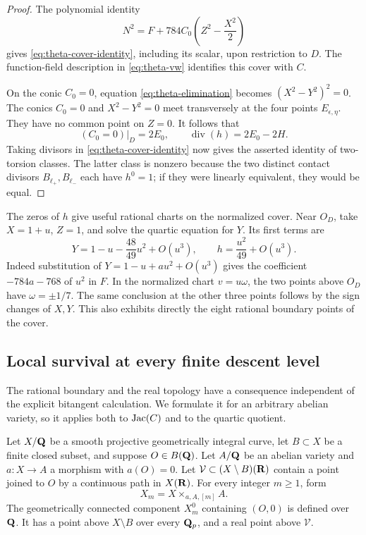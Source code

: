 \begin{proof}
The polynomial identity
\begin{equation}
 N^2=F+784C_0\left(Z^2-\frac{X^2}{2}\right)
 \label{eq:theta-conic-identity}
\end{equation}
gives \eqref{eq:theta-cover-identity}, including its scalar, upon
restriction to $D$.  The function-field description in
\eqref{eq:theta-vw} identifies this cover with $C$.

On the conic $C_0=0$, equation \eqref{eq:theta-elimination} becomes
$(X^2-Y^2)^2=0$.  The conics $C_0=0$ and $X^2-Y^2=0$ meet transversely at
the four points $E_{\epsilon,\eta}$.  They have no common point on $Z=0$.
It follows that
\[
 (C_0=0)|_D=2E_0,\qquad
 \operatorname{div}(h)=2E_0-2H.
\]
Taking divisors in \eqref{eq:theta-cover-identity} now gives the asserted
identity of two-torsion classes.  The latter class is nonzero because the
two distinct contact divisors $B_{\ell_+},B_{\ell_-}$ each have
$h^0=1$; if they were linearly equivalent, they would be equal.
\end{proof}

The zeros of $h$ give useful rational charts on the normalized cover.
Near $O_D$, take $X=1+u$, $Z=1$, and solve the quartic equation for $Y$.
Its first terms are
\begin{equation}
 Y=1-u-\frac{48}{49}u^2+O(u^3),\qquad
 h=\frac{u^2}{49}+O(u^3).
 \label{eq:theta-boundary-expansion}
\end{equation}
Indeed substitution of $Y=1-u+au^2+O(u^3)$ gives the coefficient
$-784a-768$ of $u^2$ in $F$.  In the normalized chart $v=u\omega$, the
two points above $O_D$ have $\omega=\pm1/7$.  The same conclusion at the
other three points follows by the sign changes of $X,Y$.  This also
exhibits directly the eight rational boundary points of the cover.

\subsection{Local survival at every finite descent level}

The rational boundary and the real topology have a consequence independent
of the explicit bitangent calculation.  We formulate it for an arbitrary
abelian variety, so it applies both to $\operatorname{Jac}(C)$ and to the quartic quotient.

\begin{theorem}
\label{thm:theta-local-survival}
Let $X/\mathbf Q$ be a smooth projective geometrically integral curve, let
$B\subset X$ be a finite closed subset, and suppose $O\in B(\mathbf Q)$.
Let $A/\mathbf Q$ be an abelian variety and $a:X\to A$ a morphism with $a(O)=0$.
Let $\mathcal V\subset (X\setminus B)(\mathbf R)$ contain a point joined to $O$
by a continuous path in $X(\mathbf R)$.
For every integer $m\ge1$, form
\[
 X_m=X\times_{a,A,[m]}A.
\]
The geometrically connected component $X_m^0$ containing $(O,0)$ is
defined over $\mathbf Q$.  It has a point above $X\setminus B$ over every
$\mathbf Q_p$, and a real point above $\mathcal V$.
\end{theorem}

